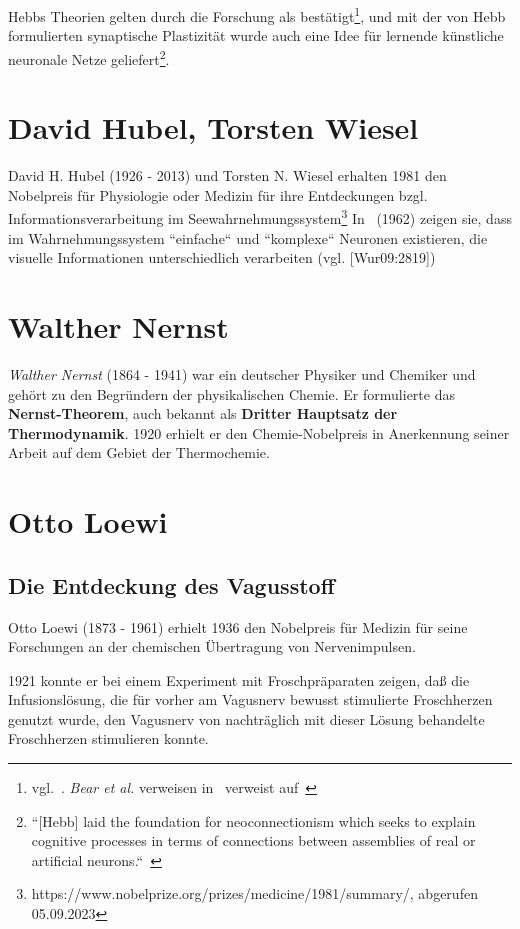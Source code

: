 Hebbs Theorien gelten durch die Forschung als bestätigt\footnote{
vgl.~\cite[833]{Flo19}. \textit{Bear et al.} verweisen in~\cite[875, Exkurs 23.5]{BCP18} verweist auf~\cite{CL78}
}, und mit der von Hebb formulierten synaptische Plastizität wurde auch eine Idee für lernende künstliche neuronale Netze geliefert\footnote{
``[Hebb] laid the foundation for neoconnectionism which seeks to explain cognitive processes in terms of connections between assemblies of real or artificial neurons.``~\cite[2]{Kle99}
}.


\section{David Hubel, Torsten Wiesel}\label{appendix:hubelwiesel}

David H. Hubel (1926 - 2013) und Torsten N. Wiesel erhalten 1981 den Nobelpreis für Physiologie oder Medizin  für ihre Entdeckungen bzgl. Informationsverarbeitung im Seewahrnehmungssystem\footnote{
    https://www.nobelprize.org/prizes/medicine/1981/summary/, abgerufen 05.09.2023
}
In~\cite{HW62} (1962) zeigen sie, dass im Wahrnehmungssystem ``einfache`` und ``komplexe`` Neuronen existieren, die visuelle Informationen unterschiedlich verarbeiten (vgl. [Wur09:2819])

\section{Walther Nernst}
\textit{Walther Nernst} (1864 - 1941) war ein deutscher Physiker und Chemiker und gehört zu den Begründern der physikalischen Chemie. Er formulierte das \textbf{Nernst-Theorem}, auch bekannt als \textbf{Dritter Hauptsatz der Thermodynamik}. 1920 erhielt er den Chemie-Nobelpreis in Anerkennung seiner Arbeit auf dem Gebiet der Thermochemie.


\section{Otto Loewi}
\subsection*{Die Entdeckung des Vagusstoff}

Otto Loewi (1873 - 1961) erhielt 1936 den Nobelpreis für Medizin für seine Forschungen an der chemischen Übertragung von Nervenimpulsen.

1921 konnte er bei einem Experiment mit Froschpräparaten zeigen, daß die Infusionslösung, die für vorher am Vagusnerv bewusst stimulierte Froschherzen genutzt wurde, den Vagusnerv von nachträglich mit dieser Lösung behandelte Froschherzen stimulieren konnte.

